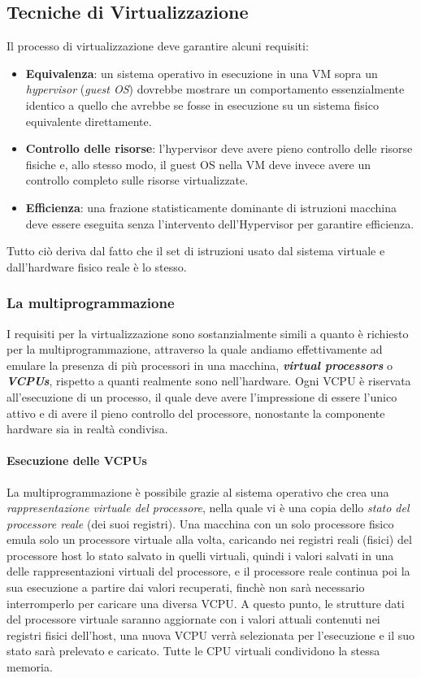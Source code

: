 \documentclass{article}
\begin{document}
\subsection{Tecniche di Virtualizzazione}
Il processo di virtualizzazione deve garantire alcuni requisiti:
\begin{itemize}
    \item\textbf{Equivalenza}: un sistema operativo in esecuzione in una VM sopra un \textit{hypervisor} (\textit{guest OS}) dovrebbe mostrare un comportamento essenzialmente identico a quello che avrebbe se fosse in esecuzione su un sistema fisico equivalente direttamente.
    \item\textbf{Controllo delle risorse}: l’hypervisor deve avere pieno controllo delle risorse fisiche e, allo stesso modo, il guest OS nella VM deve invece avere un controllo completo sulle risorse virtualizzate.
    \item\textbf{Efficienza}: una frazione statisticamente dominante di istruzioni macchina deve essere eseguita senza l’intervento dell’Hypervisor per garantire efficienza.
\end{itemize}

Tutto ciò deriva dal fatto che il set di istruzioni usato dal sistema virtuale e dall’hardware fisico reale è lo stesso.

\subsubsection{La multiprogrammazione}
I requisiti per la virtualizzazione sono sostanzialmente simili a quanto è richiesto per la multiprogrammazione, attraverso la quale andiamo effettivamente ad emulare la presenza di più processori in una macchina, \textit{\textbf{virtual processors}} o \textit{\textbf{VCPUs}}, rispetto a quanti realmente sono nell’hardware.
Ogni VCPU è riservata all’esecuzione di un processo, il quale deve avere l’impressione di essere l’unico attivo e di avere il pieno controllo del processore, nonostante la componente hardware sia in realtà condivisa.

\paragraph{Esecuzione delle VCPUs}
La multiprogrammazione è possibile grazie al sistema operativo che crea una \textit{rappresentazione virtuale del processore}, nella quale vi è una copia dello \textit{stato del processore reale} (dei suoi registri).
Una macchina con un solo processore fisico emula solo un processore virtuale alla volta, caricando nei registri reali (fisici) del processore host lo stato salvato in quelli virtuali, quindi i valori salvati in una delle rappresentazioni virtuali del processore, e il processore reale continua poi la sua esecuzione a partire dai valori recuperati, finchè non sarà necessario interromperlo per caricare una diversa VCPU.
A questo punto, le strutture dati del processore virtuale saranno aggiornate con i valori attuali contenuti nei registri fisici dell’host, una nuova VCPU verrà selezionata per l’esecuzione e il suo stato sarà prelevato e caricato.
Tutte le CPU virtuali condividono la stessa memoria.
\end{document}
